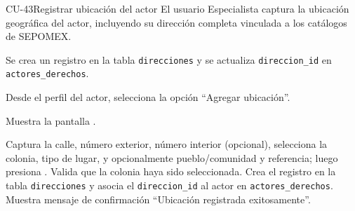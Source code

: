 \begin{UseCase}{CU-43}{Registrar ubicación del actor}{
		El usuario Especialista captura la ubicación geográfica del actor, incluyendo su dirección completa vinculada a los catálogos de SEPOMEX.
	}
{\begin{Titemize}
			\Titem Se crea un registro en la tabla \texttt{direcciones} y se actualiza \texttt{direccion\_id} en \texttt{actores\_derechos}.
		\end{Titemize}
	}
\end{UseCase}
\begin{UCtrayectoria}
	\UCpaso[\UCactor] Desde el perfil del actor, selecciona la opción ``Agregar ubicación''.
	
	\UCpaso Muestra la pantalla .
	
	
	\UCpaso[\UCactor] \label{CU-43.ingresaUbicacion} Captura la calle, número exterior, número interior (opcional), selecciona la colonia, tipo de lugar, y opcionalmente pueblo/comunidad y referencia; luego presiona .
	\UCpaso Valida que la colonia haya sido seleccionada. 
	\UCpaso Crea el registro en la tabla \texttt{direcciones} y asocia el \texttt{direccion\_id} al actor en \texttt{actores\_derechos}.
	\UCpaso Muestra mensaje de confirmación ``Ubicación registrada exitosamente''.
\end{UCtrayectoria}

